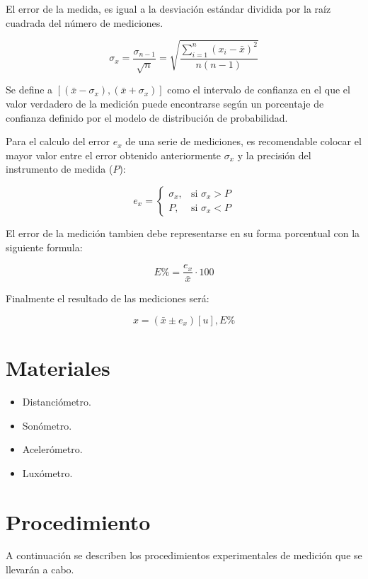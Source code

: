 \documentclass[letter,11pt]{article}
\begin{document}
El error de la medida, es igual a la desviación estándar dividida por la raíz
cuadrada del número de mediciones.

\begin{equation}
    \sigma_x = \frac{\sigma_{n-1}}{\sqrt{n}}
             = \sqrt{\frac{\sum_{i=1}^{n} (x_i-\bar{x})^2}{n(n-1)}}
\end{equation}

Se define a $[(\bar{x}-\sigma_x), (\bar{x}+\sigma_x)]$ como el intervalo de
confianza en el que el valor verdadero de la medición puede encontrarse según un
porcentaje de confianza definido por el modelo de distribución de probabilidad.

Para el calculo del error $e_x$ de una serie de mediciones, es recomendable
colocar el mayor valor entre el error obtenido anteriormente $\sigma_x$ y la
precisión del instrumento de medida ($P$):

\begin{equation}
    e_x = \begin{cases}
        \sigma_x, & \mbox{si }\sigma_x > P \\
        P,        & \mbox{si }\sigma_x < P
    \end{cases}
\end{equation}

El error de la medición tambien debe representarse en su forma porcentual con la
siguiente formula:

\begin{equation}
    E\% = \frac{e_x}{\bar{x}}\cdot100
\end{equation}

Finalmente el resultado de las mediciones será:

\begin{equation}
    x = (\bar{x}\pm e_x)[u], E\%
\end{equation}

\section{Materiales}
\begin{itemize}
\item Distanciómetro.
\item Sonómetro.
\item Acelerómetro.
\item Luxómetro.
\end{itemize}

\section{Procedimiento}
A continuación se describen los procedimientos experimentales de medición que se
llevarán a cabo.
\end{document}
